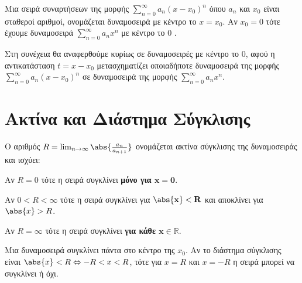 



\pagestyle{vangelis}
\geometry{left=15.63mm,right=15.63mm,top=30.25mm,bottom=34.25mm,
footskip=24.16mm,headsep=24.16mm}




\begin{center}
  \minibox{\large\bfseries \textcolor{Col1}{Δυναμοσειρές}}
\end{center}

\vspace{\baselineskip}

\begin{dfn}
  Μια σειρά συναρτήσεων της μορφής $ \sum_{n=0}^{\infty} a_{n}(x- x_{0})^{n} $ 
  όπου $ a_{n} $ και $ x_{0} $ είναι σταθεροί αριθμοί, ονομάζεται 
  \textcolor{Col1}{δυναμοσειρά} με κέντρο το $ x= x_{0} $. 
  Αν $ x_{0}=0 $ τότε έχουμε δυναμοσειρά 
  $ \sum_{n=0}^{\infty} a_{n} x^{n} $ με κέντρο το 0 .
\end{dfn}

\begin{rem}
  Στη συνέχεια θα αναφερθούμε κυρίως σε δυναμοσειρές με κέντρο το 0, αφού η 
  αντικατάσταση $ t=x- x_{0} $ μετασχηματίζει οποιαδήποτε δυναμοσειρά της μορφής 
  $ \sum_{n=0}^{\infty} a_{n}(x- x_{0})^{n} $ σε δυναμοσειρά της μορφής $
  \sum_{n=0}^{\infty} a_{n} x^{n} $. 
\end{rem}

\section*{Ακτίνα και Διάστημα Σύγκλισης}

\begin{dfn}
  Ο αριθμός $ R = \lim_{n \to \infty} \abs{\frac{a_{n}}{a_{n+1}}} $ ονομάζεται 
  \textcolor{Col1}{ακτίνα σύγκλισης} της δυναμοσειράς και ισχύει:
  \begin{myitemize}
    \item Αν $ R=0 $ τότε η σειρά συγκλίνει \textbf{μόνο για $ \mathbf{x=0} $}.
    \item Αν $0 < R < \infty $ τότε η σειρά συγκλίνει για $ \mathbf{\abs{x} < R} $ και 
      αποκλίνει για $ \abs{x} > R $.
    \item Αν $ R= \infty $ τότε η σειρά συγκλίνει \textbf{για κάθε $ \mathbf{x \in
      \mathbb{R}} $}.
  \end{myitemize}
\end{dfn}

\begin{rem}
    Μια δυναμοσειρά συγκλίνει πάντα στο κέντρο της $ x_{0} $.
    Αν το διάστημα σύγκλισης είναι $ \abs{x} < R \Leftrightarrow -R < x < R $, 
      τότε για $ x=R $ και $ x=-R $ η σειρά μπορεί να συγκλίνει ή όχι.
\end{rem}

